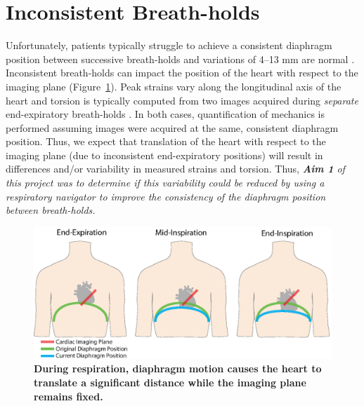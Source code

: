 \section{Inconsistent Breath-holds}
	Unfortunately, patients typically struggle to achieve a consistent diaphragm position between successive breath-holds and variations of 4--13 mm are normal \cite{Liu1993,Wang1995a,Taylor1997a,Holland1998c,Fischer2006a}. Inconsistent breath-holds can impact the position of the heart with respect to the imaging plane (Figure~\ref{fig:range_of_diaphragm_position_breathing}). Peak strains vary along the longitudinal axis of the heart \cite{Kuijer2002,Moore2000,Young1994a,Feng2009,NasiraeiMoghaddam2010,Donekal2013a,Suever2017} and torsion is typically computed from two images acquired during \textit{separate} end-expiratory breath-holds \cite{Donekal2013a}. In both cases, quantification of mechanics is performed assuming images were acquired at the same, consistent diaphragm position. Thus, we expect that translation of the heart with respect to the imaging plane (due to inconsistent end-expiratory positions) will result in differences and/or variability in measured strains and torsion. Thus, \textit{\textbf{Aim 1} of this project was to determine if this variability could be reduced by using a respiratory navigator to improve the consistency of the diaphragm position between breath-holds.}
	
	\begin{figure}
		\centering
		\includegraphics{figures/intro/range_of_diaphragm_position_breathing}
		\caption[During respiration, diaphragm motion causes the heart to translate a significant distance while the imaging plane remains fixed]{\textbf{During respiration, diaphragm motion causes the heart to translate a significant distance while the imaging plane remains fixed.}}
		\label{fig:range_of_diaphragm_position_breathing}
	\end{figure}
	
